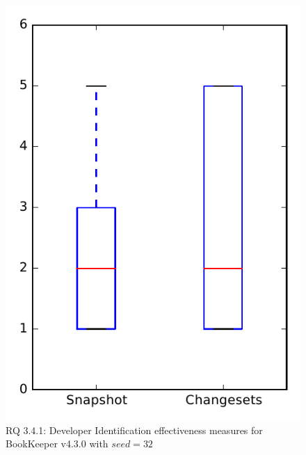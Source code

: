 
\begin{figure}
\centering
\includegraphics[height=0.4\textheight]{figures/dit_seed/rq1_bookkeeper_32}
\caption{RQ 3.4.1: Developer Identification effectiveness measures for BookKeeper v4.3.0 with $seed=32$}
\label{fig:dit_seed:rq1:bookkeeper}
\end{figure}
